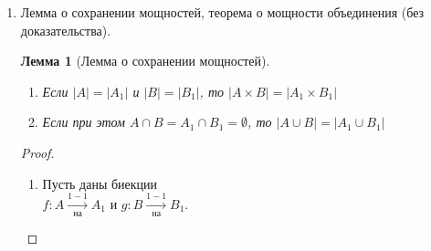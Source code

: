 \documentclass[a4paper]{article}
\newtheorem*{lemma*}{Лемма}
\theoremstyle{definition}
\newtheorem*{definition*}{Определение}
\newtheorem*{consequence*}{Следствие}
\begin{document}
\begin{enumerate}
\begin{definition*}[Счётное множество]
       \end{definition*}
       \begin{definition*}[Континуальное множество]
        Множество $A$ \textit{континуально}, если $|A| = |\mathbb{R}|$.
       \end{definition*}
       \begin{definition*}[Не более чем счётное множество]
        Множество $A$ \textit{не более чем счётно}, если $|A| \leq |\mathbb{N}|$
       \end{definition*}
       \begin{consequence*}[Описание не более чем счётных множеств]
        Множество не более чем счётно тогда и только тогда, когда оно конечно или счётно.
       \end{consequence*}
       \begin{proof}
        $\Leftarrow$: счётное множество не более чем счётно. Если $A$ конечно, то $|A| = |\mathbb{N} _k|\leq |\mathbb{N}|$. \\
        $\Rightarrow$: Пусть $A$ не более чем счётно. Предположим, что оно бесконечно. Тогда в $A$ есть счётное подмножество $B$. Получаем, что $|\mathbb{N}| - |B| \leq |A| \leq |\mathbb{N}|$. По теореме Кантора-Бернштейна $|A| = |\mathbb{N}|$.
       \end{proof}
 \item Лемма о сохранении мощностей, теорема о мощности объединения (без доказательства).
       \begin{lemma*}[Лемма о сохранении мощностей]\mbox{}\\
        \begin{enumerate}
         \item Если $\left | A \right | = \left | A_{1} \right |$ и $\left | B \right | = \left | B_{1} \right |$, то $\left | A\times B \right | = \left | A_{1}\times B_{1} \right |$\\
         \item Если при этом $A\cap B = A_{1}\cap B_{1}=\emptyset $, то $\left | A \cup B \right | =\left | A_{1} \cup B_{1} \right |  $
        \end{enumerate}
       \end{lemma*}
       \begin{proof}\mbox{}\\
        \begin{enumerate}
         \item Пусть даны биекции \\$f : A\xrightarrow[\text{на}]{1-1}A_{1}$ и $g : B\xrightarrow[\text{на}]{1-1}B_{1}$.\\

\end{enumerate}
\end{proof}
\end{enumerate}
\end{document}

